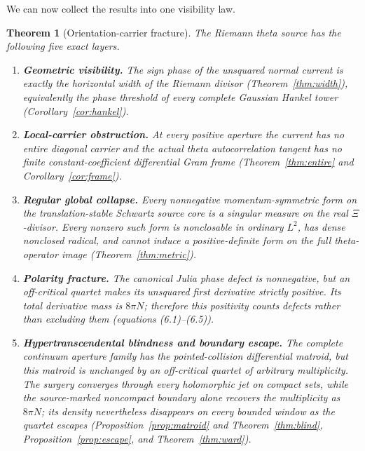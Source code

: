 \documentclass[11pt]{article}
\newtheorem{theorem}{Theorem}[section]
\theoremstyle{definition}
\theoremstyle{remark}
\begin{document}
We can now collect the results into one visibility law.

\begin{theorem}[Orientation-carrier fracture]
\label{thm:main}
The Riemann theta source has the following five exact layers.
\begin{enumerate}[label=\textup{\Alph*.}]
\item \textbf{Geometric visibility.}
      The sign phase of the unsquared normal current is exactly the
      horizontal width of the Riemann divisor
      (Theorem~\ref{thm:width}), equivalently the phase threshold of
      every complete Gaussian Hankel tower
      (Corollary~\ref{cor:hankel}).
\item \textbf{Local-carrier obstruction.}
      At every positive aperture the current has no entire diagonal
      carrier and the actual theta autocorrelation tangent has no
      finite constant-coefficient differential Gram frame
      (Theorem~\ref{thm:entire} and
      Corollary~\ref{cor:frame}).
\item \textbf{Regular global collapse.}
      Every nonnegative momentum-symmetric form on the
      translation-stable Schwartz source core is a singular measure on
      the real \(\Xi\)-divisor.  Every nonzero such form is nonclosable
      in ordinary \(L^2\), has dense nonclosed radical, and cannot
      induce a positive-definite form on the full theta-operator image
      (Theorem~\ref{thm:metric}).
\item \textbf{Polarity fracture.}
      The canonical Julia phase defect is nonnegative, but an
      off-critical quartet makes its unsquared first derivative
      strictly positive.  Its total derivative mass is \(8\pi N\);
      therefore this positivity counts defects rather than excluding
      them (equations (6.1)--(6.5)).
\item \textbf{Hypertranscendental blindness and boundary escape.}
      The complete continuum aperture family has the pointed-collision
      differential matroid, but this matroid is unchanged by an
      off-critical quartet of arbitrary multiplicity.  The surgery
      converges through every holomorphic jet on compact sets, while
      the source-marked noncompact boundary alone recovers the
      multiplicity as \(8\pi N\); its density nevertheless disappears
      on every bounded window as the quartet escapes
      (Proposition~\ref{prop:matroid} and
      Theorem~\ref{thm:blind},
      Proposition~\ref{prop:escape}, and
      Theorem~\ref{thm:ward}).
\end{enumerate}
\end{theorem}
\end{document}
